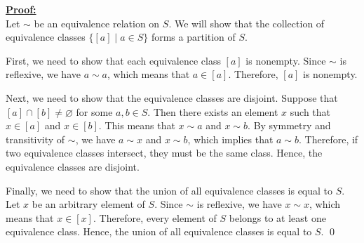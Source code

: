 \underline{\textbf{Proof:}} \\
Let $\sim$ be an equivalence relation on $S$. We will show that the collection of equivalence classes $\{ [a] \mid a \in S \}$ forms a partition of $S$.

First, we need to show that each equivalence class $[a]$ is nonempty. Since $\sim$ is reflexive, we have $a \sim a$, which means that $a \in [a]$. Therefore, $[a]$ is nonempty.

Next, we need to show that the equivalence classes are disjoint. Suppose that $[a] \cap [b] \neq \varnothing$ for some $a,b \in S$. Then there exists an element $x$ such that $x \in [a]$ and $x \in [b]$. This means that $x \sim a$ and $x \sim b$. By symmetry and transitivity of $\sim$, we have $a \sim x$ and $x \sim b$, which implies that $a \sim b$. Therefore, if two equivalence classes intersect, they must be the same class. Hence, the equivalence classes are disjoint.

Finally, we need to show that the union of all equivalence classes is equal to $S$. Let $x$ be an arbitrary element of $S$. Since $\sim$ is reflexive, we have $x \sim x$, which means that $x \in [x]$. Therefore, every element of $S$ belongs to at least one equivalence class. Hence, the union of all equivalence classes is equal to $S$. \qed

